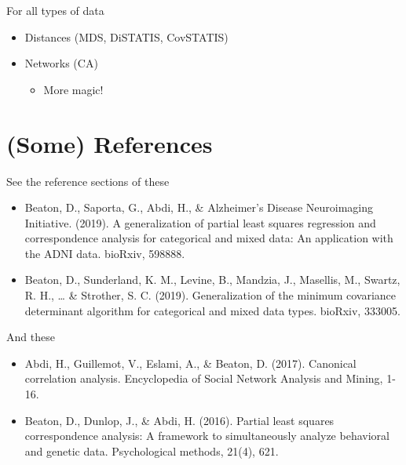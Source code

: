 \documentclass[
  ignorenonframetext,
]{beamer}
\providecommand{\tightlist}{%
  \setlength{\itemsep}{0pt}\setlength{\parskip}{0pt}}
\begin{document}
\begin{frame}{For all types of data}
\protect\hypertarget{for-all-types-of-data}{}

\begin{itemize}[<+->]
\tightlist
\item
  Distances (MDS, DiSTATIS, CovSTATIS)
\item
  Networks (CA)

  \begin{itemize}[<+->]
  \tightlist
  \item
    More magic!
  \end{itemize}
\end{itemize}

\end{frame}

\hypertarget{some-references}{%
\section{(Some) References}\label{some-references}}

\begin{frame}{See the reference sections of these}
\protect\hypertarget{see-the-reference-sections-of-these}{}

\begin{itemize}[<+->]
\item
  Beaton, D., Saporta, G., Abdi, H., \& Alzheimer's Disease Neuroimaging
  Initiative. (2019). A generalization of partial least squares
  regression and correspondence analysis for categorical and mixed data:
  An application with the ADNI data. bioRxiv, 598888.
\item
  Beaton, D., Sunderland, K. M., Levine, B., Mandzia, J., Masellis, M.,
  Swartz, R. H., \ldots{} \& Strother, S. C. (2019). Generalization of
  the minimum covariance determinant algorithm for categorical and mixed
  data types. bioRxiv, 333005.
\end{itemize}

\end{frame}

\begin{frame}{And these}
\protect\hypertarget{and-these}{}

\begin{itemize}[<+->]
\item
  Abdi, H., Guillemot, V., Eslami, A., \& Beaton, D. (2017). Canonical
  correlation analysis. Encyclopedia of Social Network Analysis and
  Mining, 1-16.
\item
  Beaton, D., Dunlop, J., \& Abdi, H. (2016). Partial least squares
  correspondence analysis: A framework to simultaneously analyze
  behavioral and genetic data. Psychological methods, 21(4), 621.
\end{itemize}

\end{frame}
\end{document}
